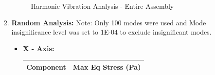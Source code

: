 \documentclass[../../main.tex]{subfiles}
\begin{document}
\begin{enumerate}
\begin{enumerate}
\begin{enumerate}
\begin{figure}[H]
                    \caption{ Harmonic Vibration Analysis - Entire Assembly }
                    \label{fig:sys_CAD}
                \end{figure}
                \newpage
                \item \textbf{Random Analysis: }Note: Only 100 modes were used and Mode insignificance level was set to 1E-04 to exclude insignificant modes.
                \begin{itemize}
                    \item \textbf{X - Axis:}
                    \begin{table}[h!]
                        \centering
                        \begin{tabular}{|p{8cm}|p{5cm}|}
                        \hline
                        \textbf{Component} & \textbf{Max Eq Stress (Pa)}\\
                        \hline
                       

\end{tabular}
\end{table}
\end{itemize}
\end{enumerate}
\end{enumerate}
\end{enumerate}
\end{document}
